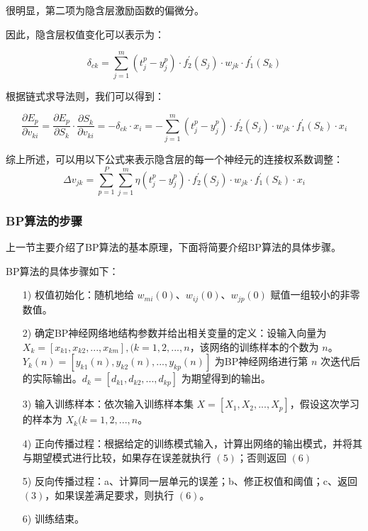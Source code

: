 \documentclass[UTF8]{ctexart}
\begin{document}
很明显，第二项为隐含层激励函数的偏微分。 \par

因此，隐含层权值变化可以表示为：

\begin{equation}
\delta_{ck} = \sum_{j=1}^{m} (t_{j}^{p} - y_{j}^{p}) \cdot f_2^{'}(S_j) \cdot w_{jk} \cdot f_1^{'}(S_k)
\end{equation}

根据链式求导法则，我们可以得到：

\begin{equation}
\frac{\partial E_p}{\partial v_{ki}} = \frac{\partial E_p}{\partial S_k} \cdot \frac{\partial S_k}{\partial v_{ki}} = - \delta_{ck} \cdot x_i = - \sum_{j=1}^{m} (t_{j}^{p} - y_{j}^{p}) \cdot f_2^{'}(S_j) \cdot w_{jk} \cdot f_1^{'}(S_k) \cdot x_i
\end{equation}

综上所述，可以用以下公式来表示隐含层的每一个神经元的连接权系数调整：
\begin{equation}
\Delta v_{jk} = \sum_{p=1}^{P} \sum_{j=1}^{m} \eta (t_{j}^{p} - y_{j}^{p}) \cdot f_2^{'}(S_j) \cdot w_{jk} \cdot f_1^{'}(S_k) \cdot x_i
\end{equation}

\subsubsection{BP算法的步骤}

上一节主要介绍了BP算法的基本原理，下面将简要介绍BP算法的具体步骤。 \par

BP算法的具体步骤如下：

\begin{itemize}
\item [1)]
权值初始化：随机地给 $w_{mi}(0)$、$w_{ij}(0)$、$w_{jp}(0)$ 赋值一组较小的非零数值。
\item [2)]
确定BP神经网络地结构参数并给出相关变量的定义：设输入向量为 $X_k = [x_{k1},x_{k2},...,x_{km}],(k=1,2,...,n$，该网络的训练样本的个数为 $n$。$Y_k(n)=[y_{k1}(n),y_{k2}(n),...,y_{kp}(n)]$ 为BP神经网络进行第 $n$ 次迭代后的实际输出。$d_k = [d_{k1},d_{k2},...,d_{kp}]$ 为期望得到的输出。
\item [3)]
输入训练样本：依次输入训练样本集 $X=[X_1,X_2,...,X_p]$，假设这次学习的样本为 $X_k(k=1,2,...,n$。
\item [4)]
正向传播过程：根据给定的训练模式输入，计算出网络的输出模式，并将其与期望模式进行比较，如果存在误差就执行 $(5)$；否则返回 $(6)$
\item [5)]
反向传播过程：a、计算同一层单元的误差；b、修正权值和阈值；c、返回 $(3)$，如果误差满足要求，则执行 $(6)$。
\item [6)]
训练结束。
\end{itemize}
\end{document}
